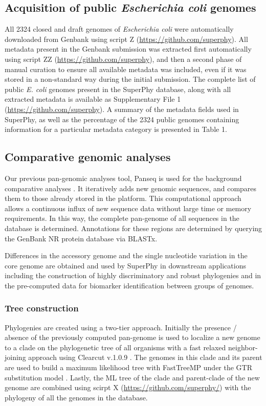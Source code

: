 \documentclass{bmcart}
\begin{document}
\subsection{Acquisition of public \textit{Escherichia coli} genomes}
All 2324 closed and draft genomes of \textit{Escherichia coli} were automatically downloaded from Genbank using script Z (\url{https://github.com/superphy}). All metadata present in the Genbank submission was extracted first automatically using script ZZ (\url{https://github.com/superphy}), and then a second phase of manual curation to ensure all available metadata was included, even if it was stored in a non-standard way during the initial submission. The complete list of public \textit{E. coli} genomes present in the SuperPhy database, along with all extracted metadata is available as Supplementary File 1 (\url{https://github.com/superphy}). A summary of the metadata fields used in SuperPhy, as well as the percentage of the 2324 public genomes containing information for a particular metadata category is presented in Table 1.

\subsection{Comparative genomic analyses}
Our previous pan-genomic analyses tool, Panseq is used for the background comparative analyses \cite{laing_pan-genome_2010}. It iteratively adds new genomic sequences, and compares them to those already stored in the platform. This computational approach allows a continuous influx of new sequence data without large time or memory requirements. In this way, the complete pan-genome of all sequences in the database is determined. Annotations for these regions are determined by querying the GenBank NR protein database via BLASTx.

Differences in the accessory genome and the single nucleotide variation in the core genome are obtained and used by SuperPhy in downstream applications including the construction of highly discriminatory and robust phylogenies and in the pre-computed data for biomarker identification between groups of genomes.

\subsubsection{Tree construction}
Phylogenies are created using a two-tier approach. Initially the presence / absence of the previously computed pan-genome is used to localize a new genome to a clade on the phylogenetic tree of all organisms with a fast relaxed neighbor-joining approach using Clearcut v.1.0.9 \cite{sheneman_clearcut:_2006}. The genomes in this clade and its parent are used to build a maximum likelihood tree with FastTreeMP under the GTR substitution model \cite{price_fasttree_2010}. Lastly, the ML tree of the clade and parent-clade of the new genome are combined using scirpt X (\url{https://github.com/superphy/}) with the phylogeny of all the genomes in the database.
\end{document}
